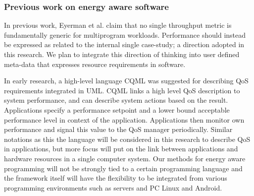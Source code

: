 \documentclass{article}
\begin{document}
\subsubsection{Previous work on energy aware software}
In previous work, Eyerman et al. \cite{Eyerman:09} claim that no single throughput metric is fundamentally generic for multiprogram workloads. 
Performance should instead be expressed as related to the internal single case-study; a direction adopted in this research. 
We plan to integrate this direction of thinking into user defined meta-data that expresses resource requirements in software.

In early research, a high-level language CQML \cite{Aagedal:01} was suggested for describing QoS requirements integrated in UML. 
CQML links a high level QoS description to system performance, and can describe system actions based on the result. 
Applications specify a performance setpoint and a lower bound acceptable performance level in context of the application. 
Applications then monitor own performance and signal this value to the QoS manager periodically. 
Similar notations as this the language will be considered in this research to describe QoS in applications, 
but more focus will put on the link between applications and hardware resources in a single computer system.
Our methods for energy aware programming will not be strongly tied to a certain programming language and the framework itself will have the flexibility to be integrated from various programming environments such as servers and PC Linux and Android.

\end{document}
